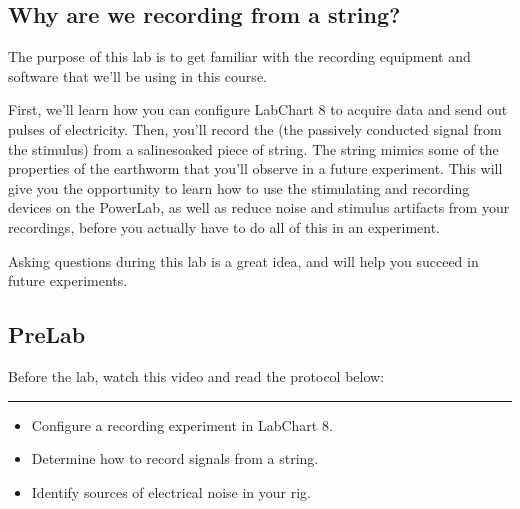\documentclass[letterpaper,10pt,english]{jupyterBook}
\begin{document}
\subsection{Why are we recording from a string?}
\label{\detokenize{StringNervousSystems:why-are-we-recording-from-a-string}}
\sphinxAtStartPar
The purpose of this lab is to get familiar with the recording equipment and software that we’ll be using in this course.

\sphinxAtStartPar
First, we’ll learn how you can configure LabChart 8 to acquire data and send out pulses of electricity. Then, you’ll record the  (the passively conducted signal from the stimulus) from a saline\sphinxhyphen{}soaked piece of string. The string mimics some of the properties of the earthworm that you’ll observe in a future experiment. This will give you the opportunity to learn how to use the stimulating and recording devices on the PowerLab, as well as reduce noise and stimulus artifacts from your recordings, before you actually have to do all of this in an experiment.

\sphinxAtStartPar
Asking questions during this lab is a great idea, and will help you succeed in future experiments.


\subsection{Pre\sphinxhyphen{}Lab}
\label{\detokenize{StringNervousSystems:pre-lab}}
\sphinxAtStartPar
Before the lab, watch this video and read the protocol below:




\bigskip\hrule\bigskip


\sphinxAtStartPar
{}
\begin{itemize}
\item {} 
\sphinxAtStartPar
Configure a recording experiment in LabChart 8.

\item {} 
\sphinxAtStartPar
Determine how to record signals from a string.

\item {} 
\sphinxAtStartPar
Identify sources of electrical noise in your rig.

\end{itemize}

\sphinxAtStartPar
{}
\end{document}
